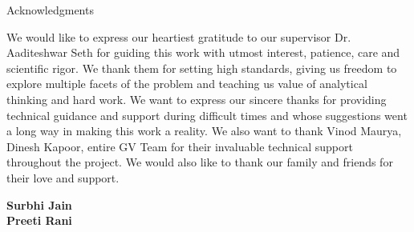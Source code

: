 \begin{center}
\LARGE{Acknowledgments} 
\end{center}

\vspace{0.5in}

We would like to express our heartiest gratitude to our supervisor Dr. Aaditeshwar Seth for guiding this work with utmost interest,
patience, care and scientific rigor. We thank them for setting high standards,
giving us freedom to explore multiple facets of the problem and teaching us
value of analytical thinking and hard work.
We want to express our sincere thanks for providing technical guidance and support during
difficult times and whose suggestions went a long way in making this work a
reality. We also want to thank Vinod Maurya, Dinesh Kapoor, entire GV Team for their invaluable technical support throughout the project. We would also like to thank our family and friends for their love and support.

\vspace{1.5in}

{\bfseries Surbhi Jain}
\ \\
{\bfseries Preeti Rani}
